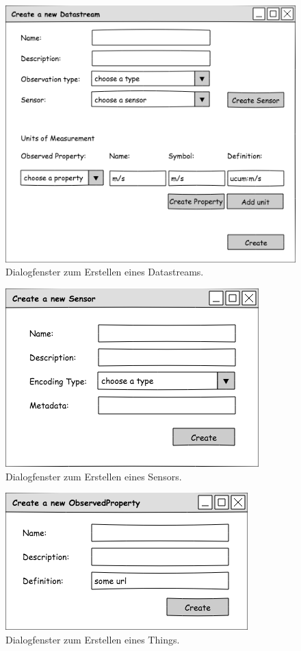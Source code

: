 \documentclass[12 pt]{article}
\begin{document}
\begin{figure}[ht]
\centering
\includegraphics[scale=1]{images/create_datastream}
\caption{\label{fig:ds}Dialogfenster zum Erstellen eines Datastreams.}
\end{figure}

\begin{figure}[ht]
\centering
\includegraphics[scale=1]{images/create_sensor}
\caption{\label{fig:sensor}Dialogfenster zum Erstellen eines Sensors.}
\end{figure}

\begin{figure}[ht]
\centering
\includegraphics[scale=1]{images/create_observedproperty}
\caption{\label{fig:obsProp}Dialogfenster zum Erstellen eines Things.}
\end{figure}
\end{document}
